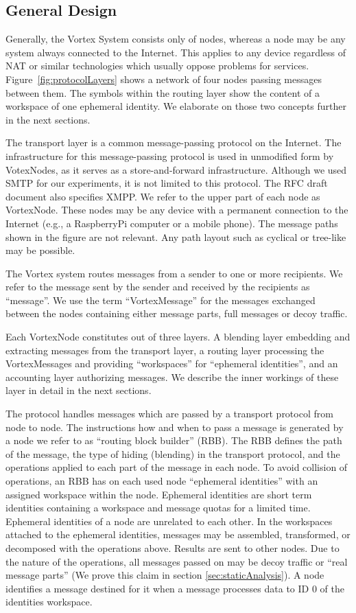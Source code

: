 \documentclass[10pt,journal,compsoc,twocolumn,twoside]{IEEEtran}
\begin{document}
\subsection{General Design}

Generally, the Vortex System consists only of nodes, whereas a node may be any system always connected to the Internet. This applies to any device regardless of NAT or similar technologies which usually oppose problems for services. Figure~\ref{fig:protocolLayers} shows a network of four nodes passing messages between them. The symbols within the routing layer show the content of a workspace of one ephemeral identity. We elaborate on those two concepts further in the next sections. 

The transport layer is a common message-passing protocol on the Internet. The infrastructure for this message-passing protocol is used in unmodified form by VotexNodes, as it serves as a store-and-forward infrastructure. Although we used SMTP for our experiments, it is not limited to this protocol. The RFC draft document also specifies XMPP. We refer to the upper part of each node as VortexNode. These nodes may be any device with a permanent connection to the Internet (e.g., a RaspberryPi computer or a mobile phone). The message paths shown in the figure are not relevant. Any path layout such as cyclical or tree-like may be possible.

The Vortex system routes messages from a sender to one or more recipients. We refer to the message sent by the sender and received by the recipients as ``message''. We use the term ``VortexMessage'' for the messages exchanged between the nodes containing either message parts, full messages or decoy traffic.

Each VortexNode constitutes out of three layers. A blending layer embedding and extracting messages from the transport layer, a routing layer processing the VortexMessages and providing ``workspaces'' for ``ephemeral identities'', and an accounting layer authorizing messages. We describe the inner workings of these layer in detail in the next sections.

The protocol handles messages which are passed by a transport protocol from node to node. The instructions how and when to pass a message is generated by a node we refer to as ``routing block builder'' (RBB). The RBB defines the path of the message, the type of hiding (blending) in the transport protocol, and the operations applied to each part of the message in each node. To avoid collision of operations, an RBB has on each used node ``ephemeral identities'' with an assigned workspace within the node. Ephemeral identities are short term identities containing a workspace and message quotas for a limited time. Ephemeral identities of a node are unrelated to each other. In the workspaces attached to the ephemeral identities, messages may be assembled, transformed, or decomposed with the operations above. Results are sent to other nodes. Due to the nature of the operations, all messages passed on may be decoy traffic or ``real message parts'' (We prove this claim in section \ref{sec:staticAnalysis}). A node identifies a message destined for it when a message processes data to ID 0 of the identities workspace.
\end{document}
